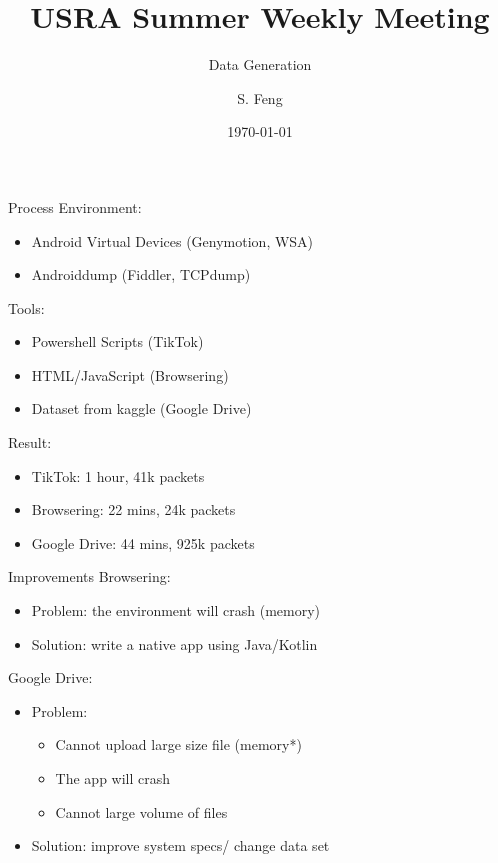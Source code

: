 \documentclass{beamer}
\title[Weekly Meeting]{
    USRA Summer Weekly Meeting
}
\subtitle[]{Data Generation}
\author[Shuo Feng]{S. Feng}
\institute[NIMS Lab]{
  NIMS Lab\\
  USRA Summer 2023}
\date{\today}
\begin{document}
\frame{\titlepage}

\begin{frame}{Process}
  Environment:
  \begin{itemize}
    \item Android Virtual Devices (Genymotion, WSA)
    \item Androiddump (Fiddler, TCPdump)
  \end{itemize}

  Tools:
  \begin{itemize}
    \item Powershell Scripts (TikTok)
    \item HTML/JavaScript (Browsering)
    \item Dataset from kaggle (Google Drive)
  \end{itemize}

  Result:
  \begin{itemize}
    \item TikTok: 1 hour, 41k packets
    \item Browsering: 22 mins, 24k packets
    \item Google Drive: 44 mins, 925k packets
  \end{itemize}
\end{frame}

\begin{frame}{Improvements}
  Browsering:
  \begin{itemize}
    \item Problem: the environment will crash (memory)
    \item Solution: write a native app using Java/Kotlin
  \end{itemize}

  Google Drive:
  \begin{itemize}
    \item Problem:
          \begin{itemize}
            \item Cannot upload large size file (memory*)
            \item The app will crash
            \item Cannot large volume of files
          \end{itemize}
    \item Solution: improve system specs/ change data set
  \end{itemize}
\end{frame}
\end{document}
